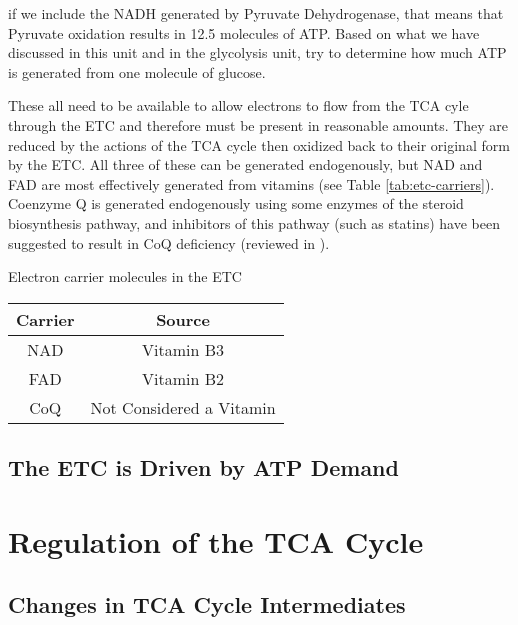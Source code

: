 \documentclass{tufte-handout}
\begin{document}
if we include the NADH generated by Pyruvate Dehydrogenase, that means that Pyruvate oxidation results in 12.5 molecules of ATP.  Based on what we have discussed in this unit and in the glycolysis unit, try to determine how much ATP is generated from one molecule of glucose.

 These all need to be available to allow electrons to flow from the TCA cyle through the ETC and therefore must be present in reasonable amounts.  They are reduced by the actions of the TCA cycle then oxidized back to their original form by the ETC.  All three of these can be generated endogenously, but NAD and FAD are most effectively generated from vitamins (see Table \ref{tab:etc-carriers}).  Coenzyme Q is generated endogenously using some enzymes of the steroid biosynthesis pathway, and inhibitors of this pathway (such as statins) have been suggested to result in CoQ deficiency (reviewed in \citet{Quinzii2007}).

\begin{margintable}
\centering
\caption{Electron carrier molecules in the ETC}
\label{tab:etc-carriers}
\begin{tabular}{cc}
\hline
\textbf {Carrier} & \textbf{Source}\\
\hline
NAD & Vitamin B3 \\
FAD & Vitamin B2  \\
CoQ & Not Considered a Vitamin \\
\hline
\end{tabular}
\end{margintable}

\subsection{The ETC is Driven by ATP Demand}

\section{Regulation of the TCA Cycle}

\subsection{Changes in TCA Cycle Intermediates}
\end{document}

